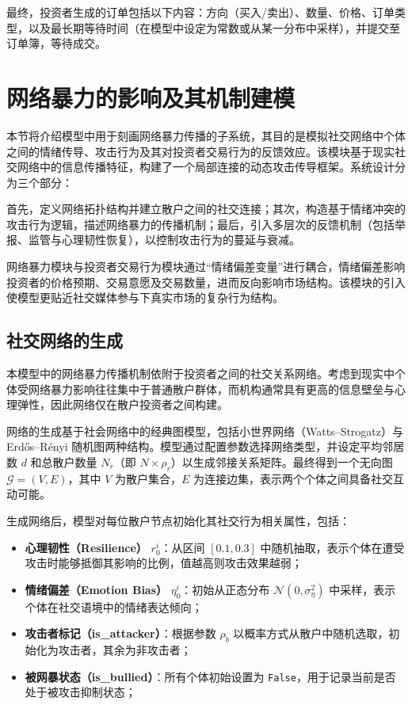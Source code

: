 最终，投资者生成的订单包括以下内容：方向（买入/卖出）、数量、价格、订单类型，以及最长期等待时间（在模型中设定为常数或从某一分布中采样），并提交至订单簿，等待成交。





\section{网络暴力的影响及其机制建模}
\label{sec:3-4}

本节将介绍模型中用于刻画网络暴力传播的子系统，其目的是模拟社交网络中个体之间的情绪传导、攻击行为及其对投资者交易行为的反馈效应。该模块基于现实社交网络中的信息传播特征，构建了一个局部连接的动态攻击传导框架。系统设计分为三个部分：

首先，定义网络拓扑结构并建立散户之间的社交连接；其次，构造基于情绪冲突的攻击行为逻辑，描述网络暴力的传播机制；最后，引入多层次的反馈机制（包括举报、监管与心理韧性恢复），以控制攻击行为的蔓延与衰减。

网络暴力模块与投资者交易行为模块通过“情绪偏差变量”进行耦合，情绪偏差影响投资者的价格预期、交易意愿及交易数量，进而反向影响市场结构。该模块的引入使模型更贴近社交媒体参与下真实市场的复杂行为结构。




\subsection{社交网络的生成}

本模型中的网络暴力传播机制依附于投资者之间的社交关系网络。考虑到现实中个体受网络暴力影响往往集中于普通散户群体，而机构通常具有更高的信息壁垒与心理弹性，因此网络仅在散户投资者之间构建。

网络的生成基于社会网络中的经典图模型，包括小世界网络（Watts–Strogatz）与 Erdős–Rényi 随机图两种结构。模型通过配置参数选择网络类型，并设定平均邻居数 \( d \) 和总散户数量 \( N_r \)（即 \( N \times \rho_r \)）以生成邻接关系矩阵。最终得到一个无向图 \( \mathcal{G} = (V, E) \)，其中 \( V \) 为散户集合，\( E \) 为连接边集，表示两个个体之间具备社交互动可能。

生成网络后，模型对每位散户节点初始化其社交行为相关属性，包括：

\begin{itemize}
    \item \textbf{心理韧性（Resilience）} \( r_0^i \)：从区间 \([0.1, 0.3]\) 中随机抽取，表示个体在遭受攻击时能够抵御其影响的比例，值越高则攻击效果越弱；
    \item \textbf{情绪偏差（Emotion Bias）} \( \eta_0^i \)：初始从正态分布 \( \mathcal{N}(0, \sigma_\eta^2) \) 中采样，表示个体在社交语境中的情绪表达倾向；
    \item \textbf{攻击者标记（is\_attacker）}：根据参数 \( \rho_b \) 以概率方式从散户中随机选取，初始化为攻击者，其余为非攻击者；
    \item \textbf{被网暴状态（is\_bullied）}：所有个体初始设置为 \texttt{False}，用于记录当前是否处于被攻击抑制状态；
\end{itemize}

